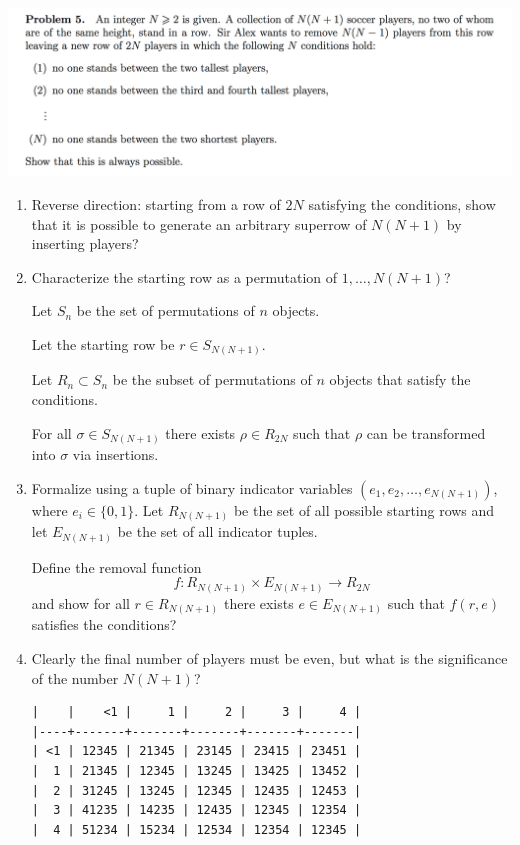 \documentclass[12pt]{article}
\begin{document}
\newpage
\begin{mdframed}
\includegraphics[width=400pt]{img/puzzles-imo-2017-5.png}
\end{mdframed}

\begin{enumerate}
\item Reverse direction: starting from a row of $2N$ satisfying the conditions, show that it is
  possible to generate an arbitrary superrow of $N(N+1)$ by inserting players?
\item Characterize the starting row as a permutation of $1, \ldots, N(N+1)$?

  Let $S_n$ be the set of permutations of $n$ objects.

  Let the starting row be $r \in S_{N(N+1)}$.

  Let $R_n \subset S_n$ be the subset of permutations of $n$ objects that satisfy the conditions.

  \begin{claim*}
    For all $\sigma \in S_{N(N+1)}$ there exists $\rho \in R_{2N}$ such that $\rho$ can be
    transformed into $\sigma$ via insertions.
  \end{claim*}

\item Formalize using a tuple of binary indicator variables $(e_1, e_2, \ldots, e_{N(N+1)})$, where
  $e_i \in \{0, 1\}$. Let $R_{N(N+1)}$ be the set of all possible starting rows and let $E_{N(N+1)}$
    be the set of all indicator tuples.

  Define the removal function
  $$f:R_{N(N+1)} \times E_{N(N+1)} \to R_{2N}$$
  and show for all $r \in R_{N(N+1)}$ there exists $e \in E_{N(N+1)}$ such that $f(r, e)$ satisfies
  the conditions?
\item Clearly the final number of players must be even, but what is the significance of the number
  $N(N+1)$?

\begin{verbatim}
|    |    <1 |     1 |     2 |     3 |     4 |
|----+-------+-------+-------+-------+-------|
| <1 | 12345 | 21345 | 23145 | 23415 | 23451 |
|  1 | 21345 | 12345 | 13245 | 13425 | 13452 |
|  2 | 31245 | 13245 | 12345 | 12435 | 12453 |
|  3 | 41235 | 14235 | 12435 | 12345 | 12354 |
|  4 | 51234 | 15234 | 12534 | 12354 | 12345 |
\end{verbatim}
\end{enumerate}
\end{document}

